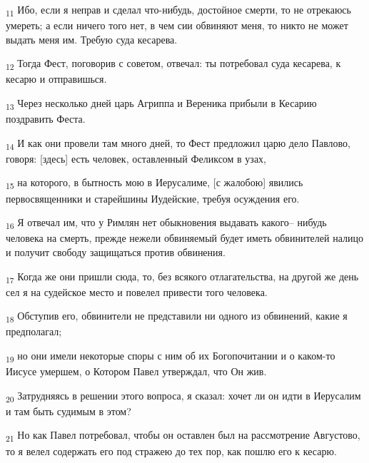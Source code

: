\begin{tcolorbox}
\textsubscript{11} Ибо, если я неправ и сделал что-нибудь, достойное смерти, то не отрекаюсь умереть; а если ничего того нет, в чем сии обвиняют меня, то никто не может выдать меня им. Требую суда кесарева.
\end{tcolorbox}
\begin{tcolorbox}
\textsubscript{12} Тогда Фест, поговорив с советом, отвечал: ты потребовал суда кесарева, к кесарю и отправишься.
\end{tcolorbox}
\begin{tcolorbox}
\textsubscript{13} Через несколько дней царь Агриппа и Вереника прибыли в Кесарию поздравить Феста.
\end{tcolorbox}
\begin{tcolorbox}
\textsubscript{14} И как они провели там много дней, то Фест предложил царю дело Павлово, говоря: [здесь] есть человек, оставленный Феликсом в узах,
\end{tcolorbox}
\begin{tcolorbox}
\textsubscript{15} на которого, в бытность мою в Иерусалиме, [с жалобою] явились первосвященники и старейшины Иудейские, требуя осуждения его.
\end{tcolorbox}
\begin{tcolorbox}
\textsubscript{16} Я отвечал им, что у Римлян нет обыкновения выдавать какого-- нибудь человека на смерть, прежде нежели обвиняемый будет иметь обвинителей налицо и получит свободу защищаться против обвинения.
\end{tcolorbox}
\begin{tcolorbox}
\textsubscript{17} Когда же они пришли сюда, то, без всякого отлагательства, на другой же день сел я на судейское место и повелел привести того человека.
\end{tcolorbox}
\begin{tcolorbox}
\textsubscript{18} Обступив его, обвинители не представили ни одного из обвинений, какие я предполагал;
\end{tcolorbox}
\begin{tcolorbox}
\textsubscript{19} но они имели некоторые споры с ним об их Богопочитании и о каком-то Иисусе умершем, о Котором Павел утверждал, что Он жив.
\end{tcolorbox}
\begin{tcolorbox}
\textsubscript{20} Затрудняясь в решении этого вопроса, я сказал: хочет ли он идти в Иерусалим и там быть судимым в этом?
\end{tcolorbox}
\begin{tcolorbox}
\textsubscript{21} Но как Павел потребовал, чтобы он оставлен был на рассмотрение Августово, то я велел содержать его под стражею до тех пор, как пошлю его к кесарю.
\end{tcolorbox}
